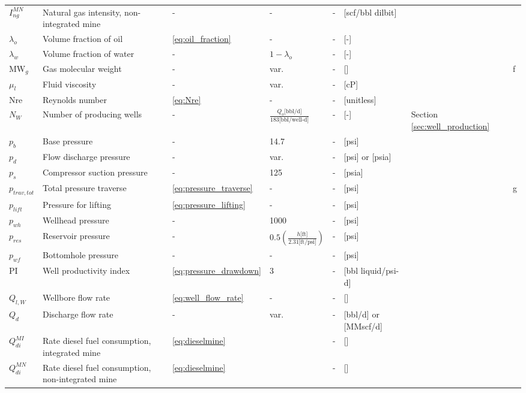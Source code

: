 \documentclass[11pt]{report}
\begin{document}
{\begin{landscape}
\begin{scriptsize}
\begin{supertabular*}{1\columnwidth}{p{0.05\columnwidth}p{0.25\columnwidth}p{0.05\columnwidth}p{0.1\columnwidth}p{0.1\columnwidth}p{0.15\columnwidth}p{0.085\columnwidth}p{0.045\columnwidth}}
$I_{ng}^{MN}$ & Natural gas intensity, non-integrated mine & - & - & - & [scf/bbl dilbit] & & \\
$\lambda _{o}$ & Volume fraction of oil & \eqref{eq:oil_fraction} & - & - & [-] & & \\
$\lambda _{w}$ & Volume fraction of water & - & $1-\lambda _{o}$ & - & [-] & & \\
MW$_{g}$ & Gas molecular weight & - & var. & - & [] & \cite[p. 35]{Manning1991} & f\\
$\mu_l$ & Fluid viscosity & - & var. & - & [cP] & \\
Nre & Reynolds number & \eqref{eq:Nre} & - & - & [unitless] & \cite{Guo2007} \\
$N_{W}$ & Number of producing wells & - & $\frac{Q_{o}\text{[bbl/d]}}{183\text{[bbl/well-d]}}$ & - & [-] & Section\,\ref{sec:well_production} & \\
$p_{b}$ & Base pressure & - & 14.7 & - & [psi] & \cite[p. 35]{Manning1991} & \\
$p_{d}$ & Flow discharge pressure & - & var. & - & [psi] or [psia] & & \\
$p_{s}$ & Compressor suction pressure & - & 125 & - & [psia] & & \\
$p_{trav,tot}$ & Total pressure traverse & \eqref{eq:pressure_traverse} & - & - & [psi] & \cite[p. 455]{Mcallister2009} & g \\
$p_{lift}$ & Pressure for lifting & \eqref{eq:pressure_lifting} & - & - & [psi] & & \\
$p_{wh}$ & Wellhead pressure & - & 1000 & - & [psi] & \cite[p. 80]{Manning1991} & \\
$p_{res}$ & Reservoir pressure & - & $0.5\left(\frac{h\text{[ft]}}{2.31\text{[ft/psi]}}\right)$ & - & [psi] & & \\
$p_{wf}$ & Bottomhole pressure & - & - & - & [psi] & & \\
PI & Well productivity index & \eqref{eq:pressure_drawdown} & 3 & - & [bbl liquid/psi-d] & & \\
$Q_{l,W}$ & Wellbore flow rate & \eqref{eq:well_flow_rate} & - & - & [] & & \\
$Q_{d}$ & Discharge flow rate & - & var. & - & [bbl/d] or [MMscf/d] & & \\
$Q_{di}^{MI}$ & Rate diesel fuel consumption, integrated mine & \eqref{eq:dieselmine} &  & - & [] & & \\
$Q_{di}^{MN}$ & Rate diesel fuel consumption, non-integrated mine & \eqref{eq:dieselmine} &  & - & [] & & \\

\end{supertabular*}
\end{scriptsize}
\end{landscape}}
\end{document}
